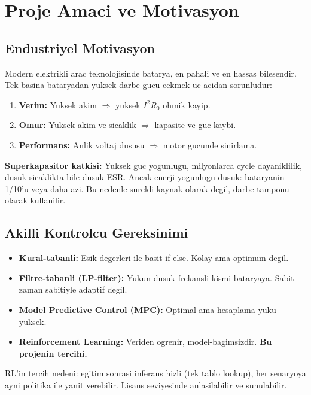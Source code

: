 \documentclass[11pt,a4paper]{article}
\begin{document}
\section{Proje Amaci ve Motivasyon}

\subsection{Endustriyel Motivasyon}

Modern elektrikli arac teknolojisinde batarya, en pahali ve en hassas bilesendir. Tek basina bataryadan yuksek darbe gucu cekmek uc acidan sorunludur:
\begin{enumerate}
  \item \textbf{Verim:} Yuksek akim $\Rightarrow$ yuksek $I^2 R_0$ ohmik kayip.
  \item \textbf{Omur:} Yuksek akim ve sicaklik $\Rightarrow$ kapasite ve guc kaybi.
  \item \textbf{Performans:} Anlik voltaj dususu $\Rightarrow$ motor gucunde sinirlama.
\end{enumerate}

\textbf{Superkapasitor katkisi:} Yuksek guc yogunlugu, milyonlarca cycle dayaniklilik, dusuk sicaklikta bile dusuk ESR. Ancak enerji yogunlugu dusuk: bataryanin 1/10'u veya daha azi. Bu nedenle surekli kaynak olarak degil, darbe tamponu olarak kullanilir.

\subsection{Akilli Kontrolcu Gereksinimi}

\begin{itemize}
  \item \textbf{Kural-tabanli:} Esik degerleri ile basit if-else. Kolay ama optimum degil.
  \item \textbf{Filtre-tabanli (LP-filter):} Yukun dusuk frekansli kismi bataryaya. Sabit zaman sabitiyle adaptif degil.
  \item \textbf{Model Predictive Control (MPC):} Optimal ama hesaplama yuku yuksek.
  \item \textbf{Reinforcement Learning:} Veriden ogrenir, model-bagimsizdir. \textbf{Bu projenin tercihi.}
\end{itemize}

\begin{whybox}
RL'in tercih nedeni: egitim sonrasi inferans hizli (tek tablo lookup), her senaryoya ayni politika ile yanit verebilir. Lisans seviyesinde anlasilabilir ve sunulabilir.
\end{whybox}
\end{document}
